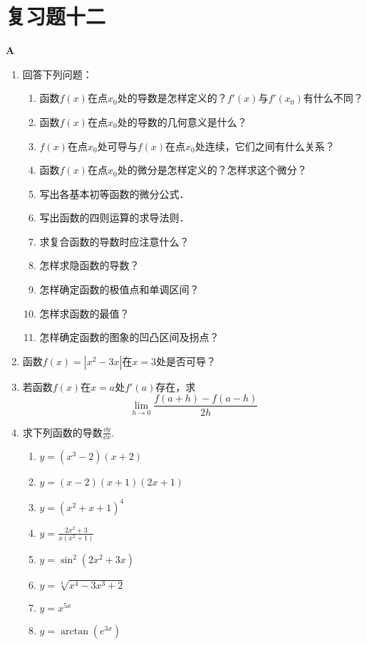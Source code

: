 \section*{复习题十二}
\begin{center}
    \bfseries A
\end{center}
\begin{enumerate}
    \item 回答下列问题：
\begin{enumerate}[(1)]
\item 函数$f(x)$在点$x_0$处的导数是怎样定义的？$f'(x)$与$f'(x_0)$有什么不同？
\item 函数$f(x)$在点$x_0$处的导数的几何意义是什么？
\item $f(x)$在点$x_0$处可导与$f(x)$在点$x_0$处连续，它们之间有什么关系？
\item 函数$f(x)$在点$x_0$处的微分是怎样定义的？怎样求这个微分？
\item 写出各基本初等函数的微分公式．
\item 写出函数的四则运算的求导法则．
\item 求复合函数的导数时应注意什么？
\item 怎样求隐函数的导数？
\item 怎样确定函数的极值点和单调区间？
\item 怎样求函数的最值？
\item 怎样确定函数的图象的凹凸区间及拐点？
\end{enumerate}

    \item 函数$f(x)=|x^2-3x|$在$x=3$处是否可导？
    \item 若函数$f(x)$在$x=a$处$f'(a)$存在，求\[\lim_{h\to 0}\frac{f(a+h)-f(a-h)}{2h}\]
    \item 求下列函数的导数$\frac{\dd y}{\dd x}$.
\begin{multicols}{2}
 \begin{enumerate}[(1)]
    \item $y=(x^3-2)(x+2)$
    \item $y=(x-2)(x+1)(2x+1)$
    \item $y=(x^2+x+1)^4$
    \item $y=\frac{2x^2+3}{x(x^2+1)}$
    \item $y=\sin^2(2x^2+3x)$
    \item $y=\sqrt[3]{x^4-3x^3+2}$
    \item $y=x^{5x}$
    \item $y=\arctan(e^{3x})$
\end{enumerate}   
\end{multicols}


\end{enumerate}
